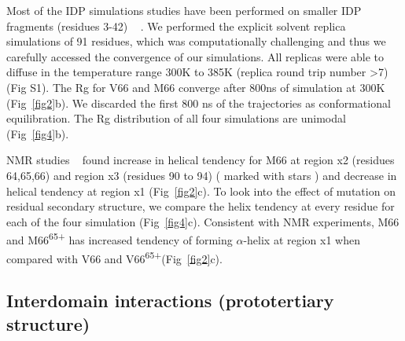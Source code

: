 \documentclass[journal=jacsat,manuscript=article]{achemso}
\begin{document}
Most of the IDP simulations studies have been performed on smaller IDP fragments (residues 3-42) ~\cite{Henriques, Rauscher2017, Meng2018} . We performed the explicit solvent replica simulations of 91 residues, which was computationally challenging and thus we carefully accessed the convergence of our simulations. All replicas were able to diffuse in the temperature range 300K to 385K (replica round trip number \textgreater 7) (Fig S1). The Rg for V66 and M66 converge after 800ns of simulation at 300K (Fig~\ref{fig2}b). We discarded the first 800 ns of the trajectories as conformational equilibration. The Rg distribution of all four simulations are unimodal (Fig~\ref{fig4}b). 


NMR studies ~\cite{Anastasia2013}  found increase in helical tendency for M66 at region x2 (residues 64,65,66) and region x3 (residues 90 to 94) ( marked with stars ) and decrease in helical tendency at region x1 (Fig~\ref{fig2}c). To look into the effect of mutation on residual secondary structure, we compare the helix tendency at every residue for each of the four simulation (Fig~\ref{fig4}c). Consistent with NMR experiments, M66 and M66\textsuperscript{65+} has increased tendency of forming $\alpha$-helix at region x1 when compared with V66 and V66\textsuperscript{65+}(Fig~\ref{fig2}c).




\subsection{Interdomain interactions (prototertiary structure)}

\end{document}
